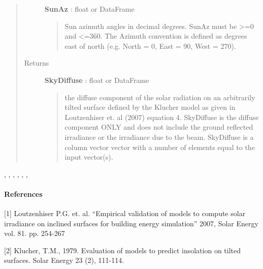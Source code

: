 \documentclass[letterpaper,10pt,english]{sphinxmanual}
\begin{document}
\begin{fulllineitems}
\begin{quote}
\begin{description}
\textbf{SunAz} : float or DataFrame
\begin{quote}

Sun azimuth angles in decimal degrees.
SunAz must be \textgreater{}=0 and \textless{}=360. The Azimuth convention is defined
as degrees east of north (e.g. North = 0, East = 90, West = 270).
\end{quote}

\item[{Returns}] \leavevmode
\textbf{SkyDiffuse} : float or DataFrame
\begin{quote}

the diffuse component of the solar radiation  on an
arbitrarily tilted surface defined by the Klucher model as given in
Loutzenhiser et. al (2007) equation 4.
SkyDiffuse is the diffuse component ONLY and does not include the ground
reflected irradiance or the irradiance due to the beam.
SkyDiffuse is a column vector vector with a number of elements equal to
the input vector(s).
\end{quote}

\end{description}\end{quote}




{\hyperref[stubs/pvlib.pvl_ephemeris:pvlib.pvl_ephemeris]{}}, {\hyperref[stubs/pvlib.pvl_extraradiation:pvlib.pvl_extraradiation]{}}, {\hyperref[stubs/pvlib.pvl_isotropicsky:pvlib.pvl_isotropicsky]{}}, {\hyperref[stubs/pvlib.pvl_haydavies1980:pvlib.pvl_haydavies1980]{}}, {\hyperref[stubs/pvlib.pvl_perez:pvlib.pvl_perez]{}}, {\hyperref[stubs/pvlib.pvl_reindl1990:pvlib.pvl_reindl1990]{}}, {\hyperref[stubs/pvlib.pvl_kingdiffuse:pvlib.pvl_kingdiffuse]{}}


\paragraph{References}

{[}1{]} Loutzenhiser P.G. et. al. ``Empirical validation of models to compute
solar irradiance on inclined surfaces for building energy simulation''
2007, Solar Energy vol. 81. pp. 254-267

{[}2{]} Klucher, T.M., 1979. Evaluation of models to predict insolation on tilted
surfaces. Solar Energy 23 (2), 111-114.

\end{fulllineitems}
\end{document}
